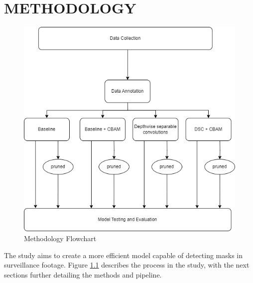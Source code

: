 \chapter{METHODOLOGY} \label{method}

\begin{figure}[!htbp]
    \centering
    \centerline{\includegraphics[width=0.92\linewidth]{images/DMIP-MethodologyFlowchart.png}}
    \caption{Methodology Flowchart}
    \label{fig:flowchart}
\end{figure}

The study aims to create a more efficient model capable of detecting masks in surveillance footage. Figure \ref{fig:flowchart} describes the process in the study, with the next sections further detailing the methods and pipeline.


















